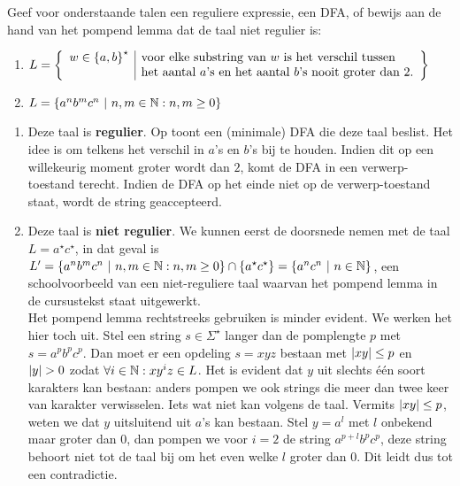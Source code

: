 \documentclass{article}
\begin{document}
\begin{question}
Geef voor onderstaande talen een reguliere expressie, een DFA, of bewijs aan de hand van het pompend lemma dat de taal niet regulier is:
\begin{enumerate}
 \item $L=\left\{ \begin{array}{l|l}w\in\left\{ a,b \right\}^{\star}&\mbox{voor elke substring van $w$ is het verschil tussen}\\&\mbox{het aantal $a$'s en het aantal $b$'s nooit groter dan 2.}\end{array} \right\}$
 \item $L=\left\{ a^nb^mc^n\ |\ n,m\in\mathbb{N}:n,m\geq 0 \right\}$
\end{enumerate}
\begin{answer}
\begin{enumerate}
 \item Deze taal is \textbf{regulier}. Op  toont een (minimale) DFA die deze taal beslist. Het idee is om telkens het verschil in $a$'s en $b$'s bij te houden. Indien dit op een willekeurig moment groter wordt dan $2$, komt de DFA in een verwerp-toestand terecht. Indien de DFA op het einde niet op de verwerp-toestand staat, wordt de string geaccepteerd.
 \item Deze taal is \textbf{niet regulier}. We kunnen eerst de doorsnede nemen met de taal $L=a^{\star}c^{\star}$, in dat geval is $L'=\left\{ a^nb^mc^n\ |\ n,m\in\mathbb{N}:n,m\geq 0 \right\}\cap\left\{ a^{\star}c^{\star} \right\}=\left\{ a^nc^n\ |\ n\in\mathbb{N} \right\}$, een schoolvoorbeeld van een niet-reguliere taal waarvan het pompend lemma in de cursustekst staat uitgewerkt.\\
 Het pompend lemma rechtstreeks gebruiken is minder evident. We werken het hier toch uit. Stel een string $s\in\Sigma^{\star}$ langer dan de pomplengte $p$ met $s=a^pb^pc^p$. Dan moet er een opdeling $s=xyz$ bestaan met $\left|xy\right|\leq p$ en $\abs{y}>0$ zodat $\forall i\in\mathbb{N}:xy^iz\in L$. Het is evident dat $y$ uit slechts \'e\'en soort karakters kan bestaan: anders pompen we ook strings die meer dan twee keer van karakter verwisselen. Iets wat niet kan volgens de taal. Vermits $\left|xy\right|\leq p$, weten we dat $y$ uitsluitend uit $a$'s kan bestaan. Stel $y=a^l$ met $l$ onbekend maar groter dan $0$, dan pompen we voor $i=2$ de string $a^{p+l}b^pc^p$, deze string behoort niet tot de taal bij om het even welke $l$ groter dan $0$. Dit leidt dus tot een contradictie.
\end{enumerate}
\end{answer}
\end{question}
\end{document}
